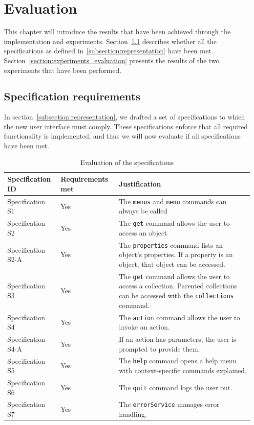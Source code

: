 \chapter{Evaluation}
\label{chapter:evaluation}
This chapter will introduce the results that have been achieved through the implementation and experiments. Section~\ref{section:specificationrequirements} describes whether all the specifications as defined in~\ref{subsection:representation} have been met. Section~\ref{section:experiments_evaluation} presents the results of the two experiments that have been performed.

\section{Specification requirements}
\label{section:specificationrequirements}
In section~\ref{subsection:representation}, we drafted a set of specifications to which the new user interface must comply. These specifications enforce that all required functionality is implemented, and thus we will now evaluate if all specifications have been met.

\begin{table}[H]
	\center

	\begin{tabularx}{\textwidth}{llX}
		\toprule
		Specification ID		&	Requirements met		& Justification \\
		\midrule
		Specification S1		& Yes								& The \texttt{menus} and \texttt{menu} commands can always be called \\
		Specification S2		& Yes								& The \texttt{get} command allows the user to access an object\\
		Specification S2-A	& Yes								& The \texttt{properties} command lists an object's properties. If a property is an object, that object can be accessed.\\
		Specification S3		& Yes								& The \texttt{get} command allows the user to access a collection. Parented collections can be accessed with the \texttt{collections} command.\\
		Specification S4		& Yes								& The \texttt{action} command allows the user to invoke an action. \\
		Specification S4-A	& Yes								& If an action has parameters, the user is prompted to provide them. \\
		Specification S5		& Yes								& The \texttt{help} command opens a help menu with context-specific commands explained. \\
		Specification S6		& Yes								& The \texttt{quit} command logs the user out. \\
		Specification S7		& Yes								& The \texttt{errorService} manages error handling. \\
		\bottomrule
	\end{tabularx}
	
	\caption{Evaluation of the specifications}
	\label{table:specificationevaluation}
		
\end{table}

